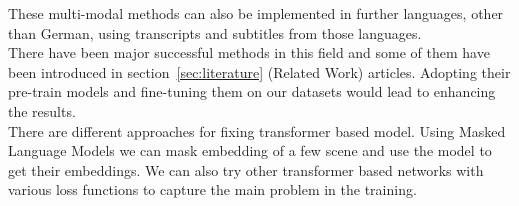 These multi-modal methods can also be implemented in further languages, other than German, using transcripts and subtitles from those languages.
\\
There have been major successful methods in this field and some of them have been introduced in section~\ref{sec:literature} (Related Work) articles. Adopting their pre-train models and fine-tuning them on our datasets would lead to enhancing the results.
\\
There are different approaches for fixing transformer based model. Using Masked Language Models we can mask embedding of a few scene and use the model to get their embeddings. We can also try other transformer based networks with various loss functions to capture the main problem in the training. 

%
